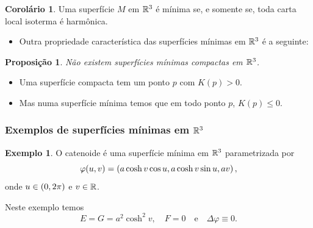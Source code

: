 \documentclass[12pt,a4paper]{beamer}
\newtheorem{proposicao}{Proposição}
\theoremstyle{definition}
\newtheorem{exemplo}{Exemplo}
\newtheorem{corolario}{Corolário}
\begin{document}
\begin{frame}
	
	\begin{corolario}
		Uma superfície $M$ em $\mathbb R^3$ é \alert{mínima} se, e somente se, \alert{toda carta local isoterma é harmônica}.
	\end{corolario}

	\pause

	\begin{itemize}
		\item Outra propriedade característica das superfícies mínimas em $\mathbb R^3$ é a seguinte:
	\end{itemize}

	\pause

	\begin{proposicao}
		\alert{Não existem} superfícies mínimas compactas em $\mathbb R^3$.
	\end{proposicao}
	
	\pause
	
	\begin{itemize}
		\item Uma superfície compacta tem um ponto $p$ com $K(p) > 0$.
		
		\pause
		
		\item Mas numa superfície mínima temos que em todo ponto $p$, $K(p) \leq 0$.
	\end{itemize}
	
\end{frame}

\begin{frame}
	\frametitle{Exemplos de superfícies mínimas em $\mathbb R^3$}
	
	\begin{exemplo}
		O \alert{catenoide} é uma superfície mínima em $\mathbb R^3$ parametrizada por
		\begin{equation*}
		\varphi(u,v) = \left( a \cosh v \cos u, a \cosh v \sin u, a v \right),
		\end{equation*}
		onde  $u \in \left( 0, 2\pi \right)$ e $v \in \mathbb R$.
	\end{exemplo}
	
	Neste exemplo temos
	\begin{equation*}
	E = G = a^2 \cosh^2 v, \quad F = 0 \quad \text{e} \quad \Delta \varphi \equiv 0.
	\end{equation*}
	
\end{frame}
\end{document}
